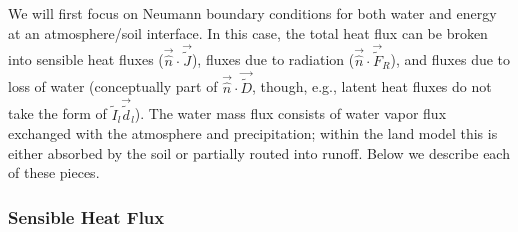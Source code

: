 \documentclass[twoside,10pt]{report}
\begin{document}
We will first focus on Neumann boundary conditions for both water and energy at an atmosphere/soil interface. In this case, the total heat flux can be broken into sensible heat fluxes ($\vec{\hat n} \cdot \vec{\tilde J}$), fluxes due to radiation ($\vec{\hat n} \cdot \vec{\tilde F}_R$), and fluxes due to loss of water (conceptually part of $\vec{\hat n} \cdot \vec{\tilde D}$, though, e.g., latent heat fluxes do not take the form of $\tilde{I}_l \vec{\tilde{d}}_l$). The water mass flux consists of water vapor flux exchanged with the atmosphere and precipitation; within the land model this is either absorbed by the soil or partially routed into runoff. Below we describe each of these pieces. 

\subsubsection{Sensible Heat Flux}
\end{document}
